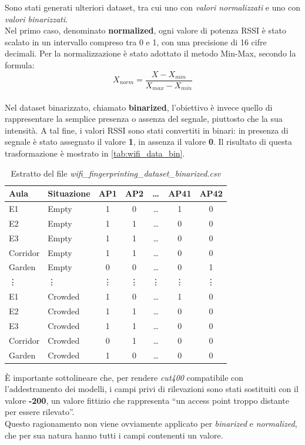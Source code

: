 \documentclass{article}
\begin{document}
Sono stati generati ulteriori dataset, tra cui uno con \textit{valori normalizzati} e uno con \textit{valori binarizzati}.\\
Nel primo caso, denominato \textbf{normalized}, ogni valore di potenza RSSI è stato scalato in un intervallo compreso tra 0 e 1, con una precisione di 16 cifre decimali. Per la normalizzazione è stato adottato il metodo Min-Max, secondo la formula:
\[X_{norm}= \frac{X-X_{min}}{X_{max}-X_{min}}\] \\
Nel dataset binarizzato, chiamato \textbf{binarized}, l'obiettivo è invece quello di rappresentare la semplice presenza o assenza del segnale, piuttosto che la sua intensità. A tal fine, i valori RSSI sono stati convertiti in binari: in presenza di segnale è stato assegnato il valore \textbf{1}, in assenza il valore \textbf{0}. Il risultato di questa trasformazione è mostrato in \autoref{tab:wifi_data_bin}. \\

\begin{table}[ht!]
    \centering
    \small
    \begin{tabular}{llc c c cc}
        \toprule
        Aula & Situazione & AP1 & AP2 & \dots & AP41 & AP42 \\
        \midrule
        E1 & Empty & 1 & 0 & \dots & 1 & 0 \\
        E2 & Empty & 1 & 1  & \dots & 0 & 0\\
        E3 & Empty & 1 & 1 & \dots & 0 & 0 \\     
        Corridor & Empty & 1 & 1  & \dots & 0 &0 \\
        Garden & Empty & 0 & 0  & \dots &  0& 1\\
         \vdots & \vdots & \vdots & \vdots & \vdots & \vdots & \vdots \\
        E1 & Crowded & 1 & 0 & \dots & 1 & 0 \\
        E2 & Crowded & 1 & 1  & \dots & 0 & 0\\   
        E3 & Crowded & 1 & 1 & \dots & 0 & 0 \\
        Corridor & Crowded & 0 & 1  & \dots & 0 & 0\\
        Garden & Crowded & 1 & 0  & \dots & 0 & 0\\
        \bottomrule
    \end{tabular}
    \caption{Estratto del file \textit{wifi\_fingerprinting\_dataset\_binarized.csv}}
    \label{tab:wifi_data_bin}
\end{table}

È importante sottolineare che, per rendere \textit{cut400} compatibile con l'addestramento dei modelli, i campi privi di rilevazioni sono stati sostituiti con il valore \textbf{-200}, un valore fittizio che rappresenta ``un access point troppo distante per essere rilevato''. \\
Questo ragionamento non viene ovviamente applicato per \textit{binarized} e \textit{normalized}, che per sua natura hanno tutti i campi contenenti un valore.\\
\end{document}
